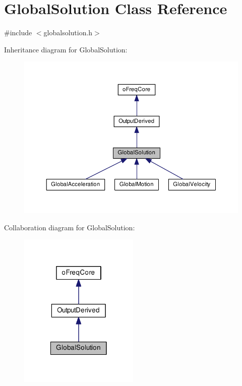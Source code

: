 \hypertarget{class_global_solution}{\section{Global\-Solution Class Reference}
\label{class_global_solution}
}


{\ttfamily \#include $<$globalsolution.\-h$>$}



Inheritance diagram for Global\-Solution\-:
\nopagebreak
\begin{figure}[H]
\begin{center}
\leavevmode
\includegraphics[width=350pt]{class_global_solution__inherit__graph}
\end{center}
\end{figure}


Collaboration diagram for Global\-Solution\-:
\nopagebreak
\begin{figure}[H]
\begin{center}
\leavevmode
\includegraphics[width=162pt]{class_global_solution__coll__graph}
\end{center}
\end{figure}
